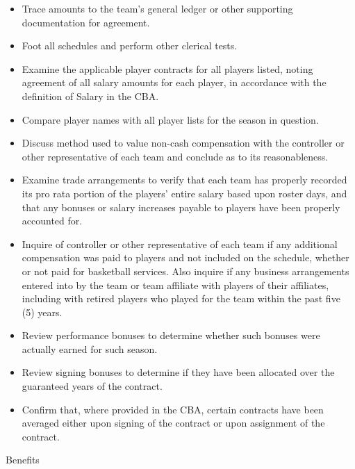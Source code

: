 \documentclass[
]{book}
\providecommand{\tightlist}{%
  \setlength{\itemsep}{0pt}\setlength{\parskip}{0pt}}
\begin{document}
\begin{itemize}
\tightlist
\item
  Trace amounts to the team's general ledger or other supporting documentation for agreement.
\item
  Foot all schedules and perform other clerical tests.
\item
  Examine the applicable player contracts for all players listed, noting agreement of all salary amounts for each player, in accordance with the definition of Salary in the CBA.
\item
  Compare player names with all player lists for the season in question.
\item
  Discuss method used to value non-cash compensation with the controller or other representative of each team and conclude as to its reasonableness.
\item
  Examine trade arrangements to verify that each team has properly recorded its pro rata portion of the players' entire salary based upon roster days, and that any bonuses or salary increases payable to players have been properly accounted for.
\item
  Inquire of controller or other representative of each team if any additional compensation was paid to players and not included on the schedule, whether or not paid for basketball services. Also inquire if any business arrangements entered into by the team or team affiliate with players of their affiliates, including with retired players who played for the team within the past five (5) years.
\item
  Review performance bonuses to determine whether such bonuses were actually earned for such season.
\item
  Review signing bonuses to determine if they have been allocated over the guaranteed years of the contract.
\item
  Confirm that, where provided in the CBA, certain contracts have been averaged either upon signing of the contract or upon assignment of the contract.
\end{itemize}

Benefits
\end{document}

